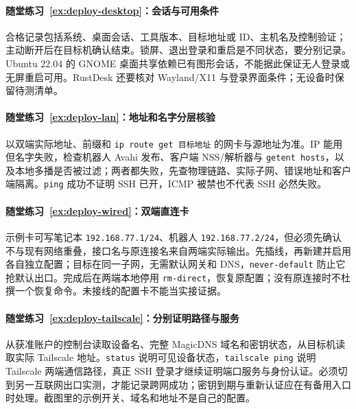 \paragraph*{随堂练习~\ref{ex:deploy-desktop}：会话与可用条件}
\begin{solution}
合格记录包括系统、桌面会话、工具版本、目标地址或 ID、主机名及控制验证；主动断开后在目标机确认结束。锁屏、退出登录和重启是不同状态，要分别记录。Ubuntu 22.04 的 GNOME 桌面共享依赖已有图形会话，不能据此保证无人登录或无屏重启可用。RustDesk 还要核对 Wayland/X11 与登录界面条件；无设备时保留待测清单。
\end{solution}

\paragraph*{随堂练习~\ref{ex:deploy-lan}：地址和名字分层核验}
\begin{solution}
以双端实际地址、前缀和 \texttt{ip route get 目标地址} 的网卡与源地址为准。IP 能用但名字失败，检查机器人 Avahi 发布、客户端 NSS/解析器与 \texttt{getent hosts}，以及本地多播是否被过滤；两者都失败，先查物理链路、实际子网、错误地址和客户端隔离。\texttt{ping} 成功不证明 SSH 已开，ICMP 被禁也不代表 SSH 必然失败。
\end{solution}

\paragraph*{随堂练习~\ref{ex:deploy-wired}：双端直连卡}
\begin{solution}
示例卡可写笔记本 \texttt{192.168.77.1/24}、机器人 \texttt{192.168.77.2/24}，但必须先确认不与现有网络重叠，接口名与原连接名来自两端实际输出。先插线，再新建并启用各自独立配置；目标在同一子网，无需默认网关和 DNS，\texttt{never-default} 防止它抢默认出口。完成后在两端本地停用 \texttt{rm-direct}，恢复原配置；没有原连接时不杜撰一个恢复命令。未接线的配置卡不能当实接证据。
\end{solution}

\paragraph*{随堂练习~\ref{ex:deploy-tailscale}：分别证明路径与服务}
\begin{solution}
从获准账户的控制台读取设备名、完整 MagicDNS 域名和密钥状态，从目标机读取实际 Tailscale 地址。\texttt{status} 说明可见设备状态，\texttt{tailscale ping} 说明 Tailscale 两端通信路径，真正 SSH 登录才继续证明端口服务与身份认证。必须切到另一互联网出口实测，才能记录跨网成功；密钥到期与重新认证应在有备用入口时处理。截图里的示例开关、域名和地址不是自己的配置。
\end{solution}

